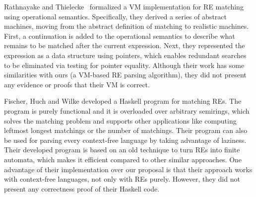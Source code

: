 \documentclass[oneside,12pt]{scrbook}
\theoremstyle{definition}
\theoremstyle{plain}
\theoremstyle{definition}
\begin{document}
Rathnayake and Thielecke~\cite{Rathnayake2011} formalized a VM implementation for RE matching using operational semantics. Specifically, they derived a series of abstract machines, moving from the abstract definition of matching to realistic machines. First, a continuation is added to the operational semantics to describe what remains to be matched after the current expression. Next, they represented the expression as a data structure using pointers, which enables redundant searches to be eliminated via testing for pointer equality. Although their work has some similarities with ours (a VM-based RE parsing algorithm), they did not present any evidence or proofs that their VM is correct.


Fischer, Huch and Wilke \cite{Fischer2010} developed a Haskell program for matching REs. The program is purely functional and it is overloaded over arbitrary semirings, which solves the matching problem and supports other applications like computing leftmost longest matchings or the number of matchings. Their program can also be used for parsing every context-free language by taking advantage of laziness. Their developed program is based on an old technique to turn REs into finite automata, which makes it efficient compared to other similar approaches. One advantage of their implementation over our proposal is that their approach works with context-free languages, not only with REs purely. However, they did not present any correctness proof of their Haskell code.


\end{document}
